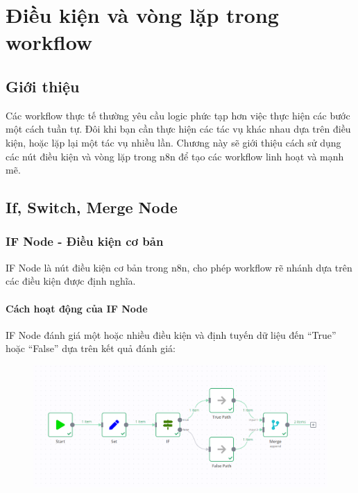 \chapter{Điều kiện và vòng lặp trong workflow}

\section{Giới thiệu}

Các workflow thực tế thường yêu cầu logic phức tạp hơn việc thực hiện các bước một cách tuần tự. Đôi khi bạn cần thực hiện các tác vụ khác nhau dựa trên điều kiện, hoặc lặp lại một tác vụ nhiều lần. Chương này sẽ giới thiệu cách sử dụng các nút điều kiện và vòng lặp trong n8n để tạo các workflow linh hoạt và mạnh mẽ.

\section{If, Switch, Merge Node}

\subsection{IF Node - Điều kiện cơ bản}

IF Node là nút điều kiện cơ bản trong n8n, cho phép workflow rẽ nhánh dựa trên các điều kiện được định nghĩa.

\subsubsection{Cách hoạt động của IF Node}

IF Node đánh giá một hoặc nhiều điều kiện và định tuyến dữ liệu đến ``True'' hoặc ``False'' dựa trên kết quả đánh giá:

\begin{figure}[htbp]
    \centering
    \includegraphics[width=1\linewidth]{Chap1-7/if-merge-node.pdf}
\end{figure} 

